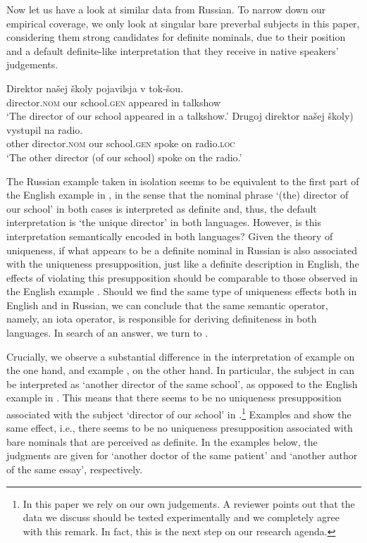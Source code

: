\documentclass[output=paper,
colorlinks,
citecolor=brown,
newtxmath
]{langscibook}
\begin{document}
Now let us have a look at similar data from Russian. To narrow down our empirical coverage, we only look at singular bare preverbal subjects in this paper, considering them strong candidates for definite nominals, due to their position and a default definite-like interpretation that they receive in native speakers' judgements.

\ea \label{ex:24}
\ea \label{ex:24a}
\gll Direktor		našej	školy			pojavilsja	v	tok-šou. \\
director.\textsc{nom}	our	school.\textsc{gen} 	appeared	in 	talkshow\\
\glt `The director of our school appeared in a talkshow.'
\ex \label{ex:24b}
\gll Drugoj	direktor \minsp{(} našej	školy)		vystupil	na	radio. \\
other director.\textsc{nom} {} our	school.\textsc{gen} spoke	on radio.\textsc{loc}\\
\glt `The other director (of our school) spoke on the radio.'
\z \z

\noindent The Russian example  taken in isolation seems to be equivalent to the first part of the English example in , in the sense that the nominal phrase `(the) director of our school' in both cases is interpreted as definite and, thus, the default interpretation is `the unique director' in both languages. However, is this interpretation semantically encoded in both languages? Given the theory of uniqueness, if what appears to be a definite nominal in Russian is also associated with the uniqueness presupposition, just like a definite description in English, the effects of violating this presupposition should be comparable to those observed in the English example . Should we find the same type of uniqueness effects both in English and in Russian, we can conclude that the same semantic operator, namely, an iota operator, is responsible for deriving definiteness in both languages. In search of an answer, we turn to .

Crucially, we observe a substantial difference in the interpretation of example  on the one hand, and example , on the other hand. In particular, the subject in  can be interpreted as `another director of the same school', as opposed to the English example in . This means that there seems to be no uniqueness presupposition associated with the subject `director of our school' in .\footnote{In this paper we rely on our own judgements. A reviewer points out that the data we discuss should be tested experimentally and we completely agree with this remark. In fact, this is the next step on our research agenda.} Examples  and  show the same effect, i.e., there seems to be no uniqueness presupposition associated with bare nominals that are perceived as definite. In the examples below, the judgments are given for `another doctor of the same patient' and `another author of the same essay', respectively.
\end{document}
